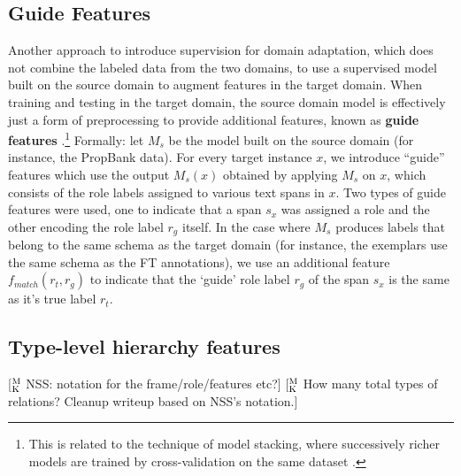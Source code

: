 \documentclass[11pt,a4paper]{article}
\newcommand{\ensuretext}[1]{#1}
\newcommand{\mkmarker}{\ensuretext{\textcolor{mdgreen}{\ensuremath{^{\textsc{M}}_{\textsc{K}}}}}}
\newcommand{\arkcomment}[3]{\ensuretext{\textcolor{#3}{[#1 #2]}}}
\newcommand{\mk}[1]{\arkcomment{\mkmarker}{#1}{mdgreen}}
\begin{document}
\subsection{Guide Features}
\label{sec:guide}
Another approach to introduce supervision for domain adaptation, 
which does not combine the labeled data from the two domains, 
to use a supervised model built on the source domain to augment features in the target domain.
When training and testing in the target domain, 
the source domain model is effectively just a form of preprocessing to provide 
additional features, known as \textbf{guide features} \citep{johansson-13,kong-14}.\footnote{This is related to the technique
of model stacking, where successively richer models are trained by cross-validation on the same dataset 
\citet[e.g.,][]{cohen-05,nivre-08,martins-08}.}
Formally: let $M_{s}$ be the model built on
the source domain (for instance, the PropBank data). 
For every target instance $x$, we introduce ``guide'' features which use the output $M_s(x)$
obtained by applying $M_s$ on $x$, which consists of the role labels assigned to various text spans in $x$. 
Two types of guide features were used,
one to indicate that a span $s_x$ was assigned a role and the other encoding the role label $r_g$ itself. 
In the case where $M_s$ produces labels
that belong to the same schema as the target domain 
(for instance, the exemplars use the same schema as the FT annotations), 
we use an additional feature $f_{match}(r_t,r_g)$ to indicate that 
the `guide' role label $r_g$ of the span $s_x$ is the same as it's true label $r_t$.


\subsection{Type-level hierarchy features}\label{sec:hierfeats}
\mk{NSS: notation for the frame/role/features etc?}
\mk{How many total types of relations? Cleanup writeup based on NSS's notation.}
\end{document}
